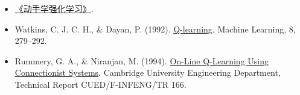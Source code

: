 \vspace{0.25em}
\begin{itemize}
\tightlist
\item
  \href{https://hrl.boyuai.com/}{《动手学强化学习》}.
\item
  Watkins, C. J. C. H., \& Dayan, P. (1992). \href{https://doi.org/10.1007/BF00992698}{Q-learning}. Machine Learning, 8, 279--292.
\item
  Rummery, G. A., \& Niranjan, M. (1994). \href{https://www.cs.utexas.edu/~shivaram/readings/b2hd-RummeryNiranjan1994.html}{On-Line Q-Learning Using Connectionist Systems}. Cambridge University Engineering Department, Technical Report CUED/F-INFENG/TR 166.
\end{itemize}

\clearpage

